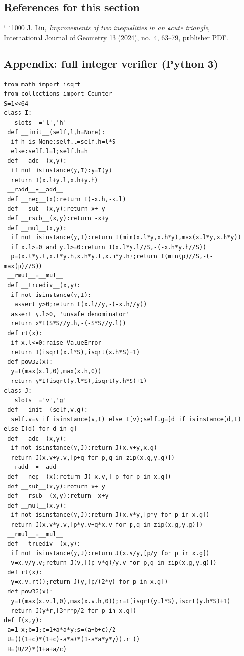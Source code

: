 \documentclass[11pt,a4paper]{article}
\makeatletter
\numberwithin{equation}{section}
\theoremstyle{definition}
\theoremstyle{remark}
\renewenvironment{thebibliography}[1]
 {\subsection*{References for this section}\small
  \list{\@biblabel{\@arabic\c@enumiv}}
       {\settowidth\labelwidth{\@biblabel{#1}}\leftmargin\labelwidth
        \advance\leftmargin\labelsep\@openbib@code
        \usecounter{enumiv}\let\p@enumiv\@empty
        \renewcommand\theenumiv{\@arabic\c@enumiv}}
  \sloppy\clubpenalty4000\widowpenalty4000\sfcode`\.=1000\relax}
 {\def\@noitemerr{\@latex@warning{Empty bibliography}}\endlist}
\makeatother
\begin{document}
\begin{thebibliography}{1}
 J. Liu, \emph{Improvements of two inequalities in an acute triangle}, International Journal of Geometry 13 (2024), no.~4, 63--79, \href{https://ijgeometry.com/wp-content/uploads/2024/09/6.-63-79.pdf}{publisher PDF}.
\end{thebibliography}

\subsection*{Appendix: full integer verifier (Python 3)}
\begingroup\scriptsize
\begin{Verbatim}
from math import isqrt
from collections import Counter
S=1<<64
class I:
 __slots__='l','h'
 def __init__(self,l,h=None):
  if h is None:self.l=self.h=l*S
  else:self.l=l;self.h=h
 def __add__(x,y):
  if not isinstance(y,I):y=I(y)
  return I(x.l+y.l,x.h+y.h)
 __radd__=__add__
 def __neg__(x):return I(-x.h,-x.l)
 def __sub__(x,y):return x+-y
 def __rsub__(x,y):return -x+y
 def __mul__(x,y):
  if not isinstance(y,I):return I(min(x.l*y,x.h*y),max(x.l*y,x.h*y))
  if x.l>=0 and y.l>=0:return I(x.l*y.l//S,-(-x.h*y.h//S))
  p=(x.l*y.l,x.l*y.h,x.h*y.l,x.h*y.h);return I(min(p)//S,-(-max(p)//S))
 __rmul__=__mul__
 def __truediv__(x,y):
  if not isinstance(y,I):
   assert y>0;return I(x.l//y,-(-x.h//y))
  assert y.l>0, 'unsafe denominator'
  return x*I(S*S//y.h,-(-S*S//y.l))
 def rt(x):
  if x.l<=0:raise ValueError
  return I(isqrt(x.l*S),isqrt(x.h*S)+1)
 def pow32(x):
  y=I(max(x.l,0),max(x.h,0))
  return y*I(isqrt(y.l*S),isqrt(y.h*S)+1)
class J:
 __slots__='v','g'
 def __init__(self,v,g):
  self.v=v if isinstance(v,I) else I(v);self.g=[d if isinstance(d,I) else I(d) for d in g]
 def __add__(x,y):
  if not isinstance(y,J):return J(x.v+y,x.g)
  return J(x.v+y.v,[p+q for p,q in zip(x.g,y.g)])
 __radd__=__add__
 def __neg__(x):return J(-x.v,[-p for p in x.g])
 def __sub__(x,y):return x+-y
 def __rsub__(x,y):return -x+y
 def __mul__(x,y):
  if not isinstance(y,J):return J(x.v*y,[p*y for p in x.g])
  return J(x.v*y.v,[p*y.v+q*x.v for p,q in zip(x.g,y.g)])
 __rmul__=__mul__
 def __truediv__(x,y):
  if not isinstance(y,J):return J(x.v/y,[p/y for p in x.g])
  v=x.v/y.v;return J(v,[(p-v*q)/y.v for p,q in zip(x.g,y.g)])
 def rt(x):
  y=x.v.rt();return J(y,[p/(2*y) for p in x.g])
 def pow32(x):
  y=I(max(x.v.l,0),max(x.v.h,0));r=I(isqrt(y.l*S),isqrt(y.h*S)+1)
  return J(y*r,[3*r*p/2 for p in x.g])
def f(x,y):
 a=1-x;b=1;c=1+a*a*y;s=(a+b+c)/2
 U=(((1+c)*(1+c)-a*a)*(1-a*a*y*y)).rt()
 H=(U/2)*(1+a+a/c)

\end{Verbatim}
\end{document}
